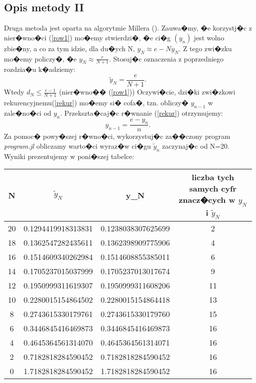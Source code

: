 \documentclass[12pt,wide]{mwart}
\begin{document}
\subsection{Opis metody II}
Druga metoda jest oparta na algorytmie Millera (\cite[strony 23-28]{JW}). Zauwa�my, �e korzystj�c z nier�wno�ci (\ref{row1}) mo�emy stwierdzi�, �e ci�g $(y_{n})$
jest wolno zbie�ny, a co za tym idzie, dla du�ych N, $y_N \approx e - Ny_N$.
Z tego zwi�zku mo�emy policzy�, �e $y_N \approx \frac{e}{N+1}$. Stosuj�c oznaczenia z poprzedniego rozdzia�u k�adziemy:\\
$$
\tilde{y}_N = \frac{e}{N+1}.     
$$
Wtedy ${d_N} \leq \frac{e-1}{N+1}$ (nier�wno�� (\ref{row1}))
Oczywi�cie, dzi�ki zwi�zkowi rekurencyjnemu(\ref{rekur}) mo�emy si� cofa�, tzn. obliczy� $y_{n-1}$ w zale�no�ci od $y_n$. Przekszta�caj�c r�wnanie (\ref{rekur}) otrzymujemy:\\
\begin{equation}\label{r2}
	y_{n-1} = \frac{e-y_n}{n}.
\end{equation}
Za pomoc� powy�szej r�wno�ci, wykorzystuj�c za��czony program \textit{program.jl} obliczamy warto�ci wyraz�w ci�gu $\tilde{y}_n$ zaczynaj�c od N=20. Wyniki prezentujemy w poni�szej tabelce:\\

\begin{flushleft}
\small{
\begin{tabular}{||c|c|c|c||} \hline
N &  $\tilde{y}_N$ & y_N & liczba tych samych cyfr znacz�cych w $y_N$ i $\tilde{y}_N$ \\ \hline

20    &  0.1294419918313831 &  0.1238038307625699 & 2\\
\hline
18    &  0.1362547282435611 &  0.1362398909775906 & 4 \\
\hline
16    &  0.1514609340262984 &  0.1514608855385011 & 6  \\
\hline
14    &  0.1705237015037999 &  0.1705237013017674 & 9\\
\hline
12    &  0.1950999311619307 &  0.1950999311608206 & 11\\
\hline
10    &  0.2280015154864502 &  0.2280015154864418 & 13 \\
\hline
8     &  0.2743615330179761 &  0.2743615330179760 & 15\\
\hline
6     &  0.3446845416469873 &  0.3446845416469873 & 16\\
\hline
4     &  0.4645364561314070 &  0.4645364561314071 & 16\\
\hline
2     &  0.7182818284590452 &  0.7182818284590452 & 16\\
\hline
0     &  1.7182818284590452 &  1.7182818284590452 & 16\\
\hline 
\end{tabular}}\\\\
\end{flushleft}
\end{document}
